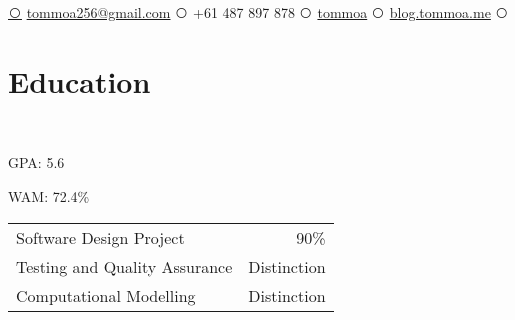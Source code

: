 \documentclass[a4paper]{style}
\def\ci#1{\textcircled{\resizebox{.5em}{!}{#1}}}
\begin{document}
{
\href{mailto:tommoa256@gmail.com}{\ci{\faEnvelope}} {\fontsize{10}{10}\selectfont \href{mailto:tommoa256@gmail.com}{tommoa256@gmail.com}}}
{
\ci{\faPhone}  {\fontsize{10}{10}\selectfont +61 487 897 878} 
}
{
\href{https://github.com/tommoa}{\ci{\faGithub}} {\fontsize{10}{10}\selectfont \href{https://github.com/tommoa}{tommoa}}
}
{
\href{https://blog.tommoa.me/}{\ci{\faFirefox}} {\fontsize{10}{10}\selectfont \href{https://blog.tommoa.me/}{blog.tommoa.me}}
}
{
\href{https://www.linkedin.com/in/tom-almeida-260866165/}{\ci{\faLinkedin}}
}


\begin{minipage}[t]{0.54\textwidth} %


\section{Education} 
 \\
\vspace{\topsep} %
\vspace{1pt}
\begin{tightitemize}
    \item GPA\@: 5.6
    \item WAM\@: 72.4\%
\end{tightitemize}
\begin{tabular}{l|r}
	Software Design Project & 90\% \\
	Testing and Quality Assurance & Distinction \\
	Computational Modelling & Distinction \\
\end{tabular}

\vspace{\topsep}


\end{minipage}
\end{document}
